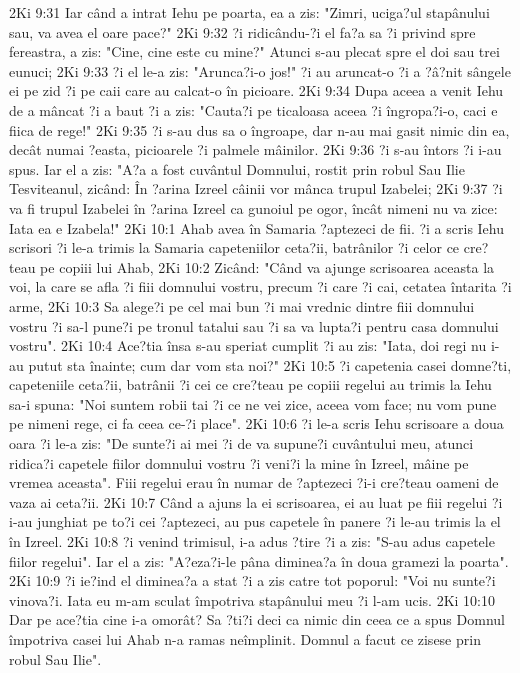 2Ki 9:31  Iar când a intrat Iehu pe poarta, ea a zis: "Zimri, uciga?ul stapânului sau, va avea el oare pace?"
2Ki 9:32  ?i ridicându-?i el fa?a sa ?i privind spre fereastra, a zis: "Cine, cine este cu mine?" Atunci s-au plecat spre el doi sau trei eunuci;
2Ki 9:33  ?i el le-a zis: "Arunca?i-o jos!" ?i au aruncat-o ?i a ?â?nit sângele ei pe zid ?i pe caii care au calcat-o în picioare.
2Ki 9:34  Dupa aceea a venit Iehu de a mâncat ?i a baut ?i a zis: "Cauta?i pe ticaloasa aceea ?i îngropa?i-o, caci e fiica de rege!"
2Ki 9:35  ?i s-au dus sa o îngroape, dar n-au mai gasit nimic din ea, decât numai ?easta, picioarele ?i palmele mâinilor.
2Ki 9:36  ?i s-au întors ?i i-au spus. Iar el a zis: "A?a a fost cuvântul Domnului, rostit prin robul Sau Ilie Tesviteanul, zicând: În ?arina Izreel câinii vor mânca trupul Izabelei;
2Ki 9:37  ?i va fi trupul Izabelei în ?arina Izreel ca gunoiul pe ogor, încât nimeni nu va zice: Iata ea e Izabela!"
2Ki 10:1  Ahab avea în Samaria ?aptezeci de fii. ?i a scris Iehu scrisori ?i le-a trimis la Samaria capeteniilor ceta?ii, batrânilor ?i celor ce cre?teau pe copiii lui Ahab,
2Ki 10:2  Zicând: "Când va ajunge scrisoarea aceasta la voi, la care se afla ?i fiii domnului vostru, precum ?i care ?i cai, cetatea întarita ?i arme,
2Ki 10:3  Sa alege?i pe cel mai bun ?i mai vrednic dintre fiii domnului vostru ?i sa-l pune?i pe tronul tatalui sau ?i sa va lupta?i pentru casa domnului vostru".
2Ki 10:4  Ace?tia însa s-au speriat cumplit ?i au zis: "Iata, doi regi nu i-au putut sta înainte; cum dar vom sta noi?"
2Ki 10:5  ?i capetenia casei domne?ti, capeteniile ceta?ii, batrânii ?i cei ce cre?teau pe copiii regelui au trimis la Iehu sa-i spuna: "Noi suntem robii tai ?i ce ne vei zice, aceea vom face; nu vom pune pe nimeni rege, ci fa ceea ce-?i place".
2Ki 10:6  ?i le-a scris Iehu scrisoare a doua oara ?i le-a zis: "De sunte?i ai mei ?i de va supune?i cuvântului meu, atunci ridica?i capetele fiilor domnului vostru ?i veni?i la mine în Izreel, mâine pe vremea aceasta". Fiii regelui erau în numar de ?aptezeci ?i-i cre?teau oameni de vaza ai ceta?ii.
2Ki 10:7  Când a ajuns la ei scrisoarea, ei au luat pe fiii regelui ?i i-au junghiat pe to?i cei ?aptezeci, au pus capetele în panere ?i le-au trimis la el în Izreel.
2Ki 10:8  ?i venind trimisul, i-a adus ?tire ?i a zis: "S-au adus capetele fiilor regelui". Iar el a zis: "A?eza?i-le pâna diminea?a în doua gramezi la poarta".
2Ki 10:9  ?i ie?ind el diminea?a a stat ?i a zis catre tot poporul: "Voi nu sunte?i vinova?i. Iata eu m-am sculat împotriva stapânului meu ?i l-am ucis.
2Ki 10:10  Dar pe ace?tia cine i-a omorât? Sa ?ti?i deci ca nimic din ceea ce a spus Domnul împotriva casei lui Ahab n-a ramas neîmplinit. Domnul a facut ce zisese prin robul Sau Ilie".
